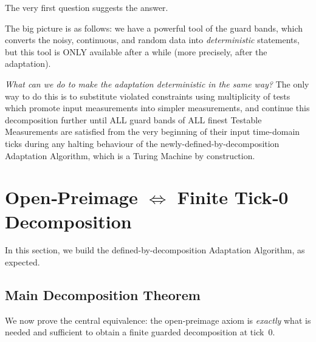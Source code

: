 \documentclass[12pt]{article}
\theoremstyle{definition}
\theoremstyle{plain}
\begin{document}
The very first question suggests the answer.

The big picture is as follows: we have a powerful tool of the guard bands, which converts the noisy, continuous, and random data into \textit{deterministic} statements, but this tool is ONLY available after a while (more precisely, after the adaptation).

\textit{What can we do to make the adaptation deterministic in the same way?
}
The only way to do this is to substitute violated constraints using multiplicity of tests which promote input measurements into simpler measurements, and continue this decomposition further until ALL guard bands of ALL finest Testable Measurements are satisfied from the very beginning of their input time-domain ticks during any halting behaviour of the newly-defined-by-decomposition Adaptation Algorithm, which is a Turing Machine by construction.

\section{Open‑Preimage $\Longleftrightarrow$ Finite Tick‑0 Decomposition}
\label{sec:open-preimage-finite-decomp}

In this section, we build the defined-by-decomposition Adaptation Algorithm, as expected.

\subsection{Main Decomposition Theorem}
\label{subsec:main-op-decomp}

We now prove the central equivalence: the open‑preimage axiom is \emph{exactly} what is needed and sufficient to obtain a finite guarded decomposition at tick 0.
\end{document}
